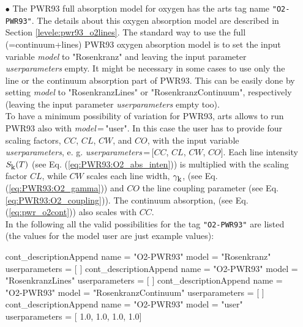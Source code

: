 \begin{itemize}
\item[$\bullet$] The PWR93 full absorption model for oxygen \citep{pwr:93}
     has the arts tag name {\tt "O2-PWR93"}. The details about this 
     oxygen absorption model are described in Section \ref{levele:pwr93_o2lines}. 
     The standard way to use the full (=continuum+lines) PWR93 oxygen 
     absorption model is to set the input variable {\it model} 
     to "Rosenkranz" and leaving the input parameter {\it userparameters} empty. 
     It might be necessary in some cases to use only the line or the 
     continuum absorption part of PWR93. This can be easily done 
     by setting {\it model} to "RosenkranzLines" or "RosenkranzContinuum", 
     respectively (leaving the input parameter {\it userparameters} 
     empty too).\\ To have a minimum possibility of variation for PWR93, 
     arts allows to run PWR93 also with {\it model}\,=\,"user". 
     In this case the user has to provide four scaling factors,  
     $CC$, $CL$, $CW$, and $CO$, with the input variable {\it userparameters}, 
     e. g. {\it userparameters}\,=\,$[$$CC$, $CL$, $CW$, $CO$$]$. 
     Each line intensity $S_{\mbox{\rm \small k}}(T)$ (see Eq. (\ref{eq:PWR93:O2_abs_inten})) 
     is multiplied with the scaling factor $CL$, while $CW$ scales 
     each line width, $\gamma_{\mbox{\rm \small k}}$, (see Eq. (\ref{eq:PWR93:O2_gamma})) and 
     $CO$ the line coupling parameter (see Eq. \ref{eq:PWR93:O2_coupling})). 
     The continuum absorption, (see Eq. (\ref{eq:pwr_o2cont})) 
     also scales with $CC$.\\
     In the following all the valid possibilities for the
     tag {\tt "O2-PWR93"} are listed (the values for the 
     model user are just example values):
\begin{code}
cont_descriptionAppend{
    name           = "O2-PWR93"
    model          = "Rosenkranz"
    userparameters = [ ]
}
cont_descriptionAppend{
    name           = "O2-PWR93"
    model          = "RosenkranzLines"
    userparameters = [ ]
}
cont_descriptionAppend{
    name           = "O2-PWR93"
    model          = "RosenkranzContinuum"
    userparameters = [ ]
}
cont_descriptionAppend{
    name           = "O2-PWR93"
    model          = "user"
    userparameters = [ 1.0, 1.0, 1.0, 1.0]
}
\end{code}
\end{itemize}

